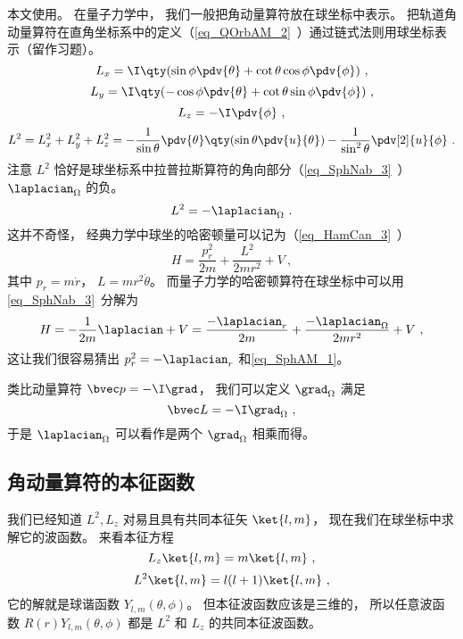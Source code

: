 

本文使用。 在量子力学中， 我们一般把角动量算符放在球坐标中表示。 把轨道角动量算符在直角坐标系中的定义（\autoref{eq_QOrbAM_2}~）通过链式法则用球坐标表示（留作习题）。
\begin{equation}
L_x = \I \qty(\sin\phi\pdv{\theta} + \cot\theta\cos\phi\pdv{\phi})~,
\end{equation}
\begin{equation}
L_y = \I \qty(-\cos\phi\pdv{\theta} + \cot\theta \sin\phi \pdv{\phi})~,
\end{equation}
\begin{equation}
L_z = -\I\pdv{\phi}~,
\end{equation}
\begin{equation}
L^2 = L_x^2 + L_y^2 + L_z^2 = -\frac{1}{\sin\theta}\pdv{\theta} \qty(\sin \theta \pdv{u}{\theta}) - \frac{1}{\sin^2 \theta} \pdv[2]{u}{\phi}~.
\end{equation}
注意 $L^2$ 恰好是球坐标系中拉普拉斯算符的角向部分（\autoref{eq_SphNab_3}~） $\laplacian_\Omega$ 的负。
\begin{equation}\label{eq_SphAM_1}
L^2 = -\laplacian_\Omega~.
\end{equation}
这并不奇怪， 经典力学中球坐的哈密顿量可以记为（\autoref{eq_HamCan_3}~）
\begin{equation}
H = \frac{p_r^2}{2m} + \frac{L^2}{2mr^2} + V~,
\end{equation}
其中 $p_r = m\dot r$， $L = mr^2\dot\theta$。 而量子力学的哈密顿算符在球坐标中可以用\autoref{eq_SphNab_3}~分解为
\begin{equation}
H = -\frac{1}{2m}\laplacian + V = \frac{-\laplacian_r}{2m} +\frac{-\laplacian_\Omega}{2mr^2} + V~,
\end{equation}
这让我们很容易猜出 $p_r^2 = -\laplacian_r$ 和\autoref{eq_SphAM_1}。

类比动量算符 $\bvec p = -\I \grad$， 我们可以定义 $\grad_\Omega$ 满足
\begin{equation}
\bvec L = -\I \grad_\Omega~,
\end{equation}
于是 $\laplacian_\Omega$ 可以看作是两个 $\grad_\Omega$ 相乘而得。

\subsection{角动量算符的本征函数}
我们已经知道 $L^2, L_z$ 对易且具有共同本征矢 $\ket{l, m}$， 现在我们在球坐标中求解它的波函数。 来看本征方程
\begin{equation}
L_z \ket{l, m} = m\ket{l, m}~,
\end{equation}
\begin{equation}
L^2 \ket{l, m} = l(l+1)\ket{l, m}~,
\end{equation}
它的解就是球谐函数 $Y_{l,m}(\theta,\phi)$。 但本征波函数应该是三维的， 所以任意波函数 $R(r)Y_{l,m}(\theta, \phi)$ 都是 $L^2$ 和 $L_z$ 的共同本征波函数。
